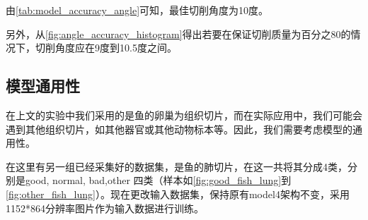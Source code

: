 由\autoref{tab:model_accuracy_angle}可知，最佳切削角度为10度。

另外，从\autoref{fig:angle_accuracy_histogram}得出若要在保证切削质量为百分之80的情况下，切削角度应在9度到10.5度之间。


\subsection{模型通用性}

在上文的实验中我们采用的是鱼的卵巢为组织切片，而在实际应用中，我们可能会遇到其他组织切片，如其他器官或其他动物标本等。因此，我们需要考虑模型的通用性。

在这里有另一组已经采集好的数据集，是鱼的肺切片，在这一共将其分成4类，分别是good, normal, bad,other 四类（样本如\autoref{fig:good_fish_lung}到\autoref{fig:other_fish_lung}）。现在更改输入数据集，保持原有model4架构不变，采用1152*864分辨率图片作为输入数据进行训练。

